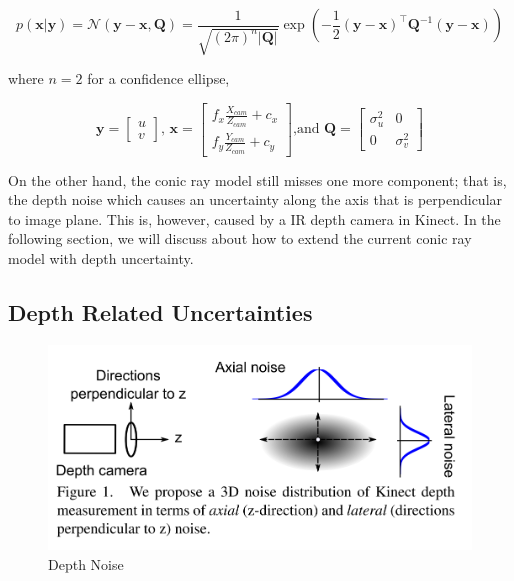 \documentclass[a4paper]{report}
\numberwithin{figure}{section}
\begin{document}
\begin{equation}
  p(\mathbf{x}|\mathbf{y}) = \mathcal{N}(\mathbf{y}-\mathbf{x, \mathbf{Q}}) = 
  \frac{1}{\sqrt{(2\pi)^n|\mathbf{Q}|}} 
  \exp(-\frac{1}{2} (\mathbf{y}-\mathbf{x})^\intercal \mathbf{Q}^{-1} (\mathbf{y}-\mathbf{x}))
\end{equation}

where $n=2$ for a confidence ellipse,

\begin{equation}
  \mathbf{y} = \begin{bmatrix}u \\ v \end{bmatrix} \text{, } 
  \mathbf{x} = \begin{bmatrix} f_x \frac{X_{cam}}{Z_{cam}} + c_x \\ f_y \frac{Y_{cam}}{Z_{cam}} + c_y \end{bmatrix} \text{,and }
  \mathbf{Q} = \begin{bmatrix} \sigma_u^2 & 0 \\ 0 & \sigma_v^2 \end{bmatrix}
\end{equation}

On the other hand, the conic ray model still misses one more component; 
that is, the depth noise which causes an uncertainty 
along the axis that is perpendicular to image plane. 
This is, however, caused by a IR depth camera in Kinect. 
In the following section, we will discuss about how to extend the current conic ray 
model with depth uncertainty.

\subsection{Depth Related Uncertainties} \label{sb_sc_depth_uncertainty}



\begin{figure}[H]
	\centering
  \includegraphics[width=0.7\linewidth,natwidth=640,natheight=640]
  {fig/ref_imgs/kinect_noise_model.png}
  \caption{Depth Noise}
	\label{fig:depth_noise}
\end{figure}
\end{document}
